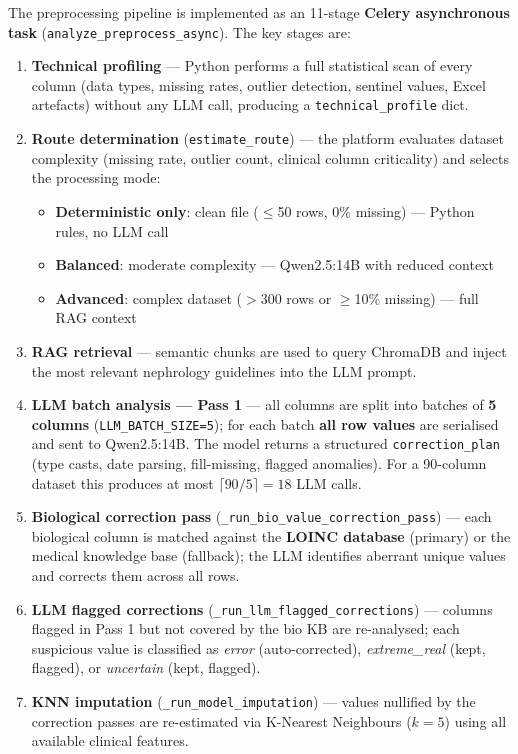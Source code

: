 \documentclass[12pt,a4paper,twoside]{report}
\begin{document}
The preprocessing pipeline is implemented as an 11-stage \textbf{Celery asynchronous task} (\texttt{analyze\_preprocess\_async}). The key stages are:

\begin{enumerate}
  \item \textbf{Technical profiling} — Python performs a full statistical scan of every column (data types, missing rates, outlier detection, sentinel values, Excel artefacts) without any LLM call, producing a \texttt{technical\_profile} dict.
  \item \textbf{Route determination} (\texttt{estimate\_route}) — the platform evaluates dataset complexity (missing rate, outlier count, clinical column criticality) and selects the processing mode:
    \begin{itemize}
      \item \textbf{Deterministic only}: clean file ($\leq$50 rows, 0\% missing) — Python rules, no LLM call
      \item \textbf{Balanced}: moderate complexity — Qwen2.5:14B with reduced context
      \item \textbf{Advanced}: complex dataset ($>$300 rows or $\geq$10\% missing) — full RAG context
    \end{itemize}
  \item \textbf{RAG retrieval} — semantic chunks are used to query ChromaDB and inject the most relevant nephrology guidelines into the LLM prompt.
  \item \textbf{LLM batch analysis — Pass 1} — all columns are split into batches of \textbf{5 columns} (\texttt{LLM\_BATCH\_SIZE=5}); for each batch \textbf{all row values} are serialised and sent to Qwen2.5:14B. The model returns a structured \texttt{correction\_plan} (type casts, date parsing, fill-missing, flagged anomalies). For a 90-column dataset this produces at most $\lceil 90/5 \rceil = 18$ LLM calls.
  \item \textbf{Biological correction pass} (\texttt{\_run\_bio\_value\_correction\_pass}) — each biological column is matched against the \textbf{LOINC database} (primary) or the medical knowledge base (fallback); the LLM identifies aberrant unique values and corrects them across all rows.
  \item \textbf{LLM flagged corrections} (\texttt{\_run\_llm\_flagged\_corrections}) — columns flagged in Pass 1 but not covered by the bio KB are re-analysed; each suspicious value is classified as \textit{error} (auto-corrected), \textit{extreme\_real} (kept, flagged), or \textit{uncertain} (kept, flagged).
  \item \textbf{KNN imputation} (\texttt{\_run\_model\_imputation}) — values nullified by the correction passes are re-estimated via K-Nearest Neighbours ($k=5$) using all available clinical features.
\end{enumerate}
\end{document}
